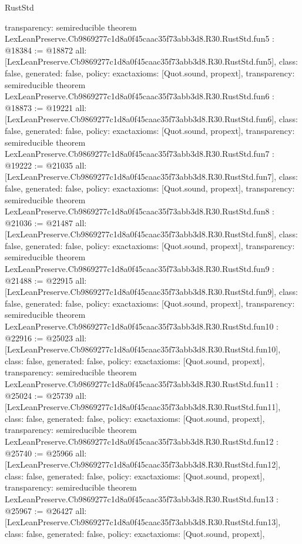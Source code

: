 \begin{lexlean}{RustStd}
\begin{coremodule}
{  transparency: semireducible
}
theorem LexLeanPreserve.Cb9869277c1d8a0f45caac35f73abb3d8.R30.RustStd.fun5 : @18384 := @18872 {
  all: [LexLeanPreserve.Cb9869277c1d8a0f45caac35f73abb3d8.R30.RustStd.fun5],
  class: false,
  generated: false,
  policy: exact{axioms: [Quot.sound, propext]},
  transparency: semireducible
}
theorem LexLeanPreserve.Cb9869277c1d8a0f45caac35f73abb3d8.R30.RustStd.fun6 : @18873 := @19221 {
  all: [LexLeanPreserve.Cb9869277c1d8a0f45caac35f73abb3d8.R30.RustStd.fun6],
  class: false,
  generated: false,
  policy: exact{axioms: [Quot.sound, propext]},
  transparency: semireducible
}
theorem LexLeanPreserve.Cb9869277c1d8a0f45caac35f73abb3d8.R30.RustStd.fun7 : @19222 := @21035 {
  all: [LexLeanPreserve.Cb9869277c1d8a0f45caac35f73abb3d8.R30.RustStd.fun7],
  class: false,
  generated: false,
  policy: exact{axioms: [Quot.sound, propext]},
  transparency: semireducible
}
theorem LexLeanPreserve.Cb9869277c1d8a0f45caac35f73abb3d8.R30.RustStd.fun8 : @21036 := @21487 {
  all: [LexLeanPreserve.Cb9869277c1d8a0f45caac35f73abb3d8.R30.RustStd.fun8],
  class: false,
  generated: false,
  policy: exact{axioms: [Quot.sound, propext]},
  transparency: semireducible
}
theorem LexLeanPreserve.Cb9869277c1d8a0f45caac35f73abb3d8.R30.RustStd.fun9 : @21488 := @22915 {
  all: [LexLeanPreserve.Cb9869277c1d8a0f45caac35f73abb3d8.R30.RustStd.fun9],
  class: false,
  generated: false,
  policy: exact{axioms: [Quot.sound, propext]},
  transparency: semireducible
}
theorem LexLeanPreserve.Cb9869277c1d8a0f45caac35f73abb3d8.R30.RustStd.fun10 : @22916 := @25023 {
  all: [LexLeanPreserve.Cb9869277c1d8a0f45caac35f73abb3d8.R30.RustStd.fun10],
  class: false,
  generated: false,
  policy: exact{axioms: [Quot.sound, propext]},
  transparency: semireducible
}
theorem LexLeanPreserve.Cb9869277c1d8a0f45caac35f73abb3d8.R30.RustStd.fun11 : @25024 := @25739 {
  all: [LexLeanPreserve.Cb9869277c1d8a0f45caac35f73abb3d8.R30.RustStd.fun11],
  class: false,
  generated: false,
  policy: exact{axioms: [Quot.sound, propext]},
  transparency: semireducible
}
theorem LexLeanPreserve.Cb9869277c1d8a0f45caac35f73abb3d8.R30.RustStd.fun12 : @25740 := @25966 {
  all: [LexLeanPreserve.Cb9869277c1d8a0f45caac35f73abb3d8.R30.RustStd.fun12],
  class: false,
  generated: false,
  policy: exact{axioms: [Quot.sound, propext]},
  transparency: semireducible
}
theorem LexLeanPreserve.Cb9869277c1d8a0f45caac35f73abb3d8.R30.RustStd.fun13 : @25967 := @26427 {
  all: [LexLeanPreserve.Cb9869277c1d8a0f45caac35f73abb3d8.R30.RustStd.fun13],
  class: false,
  generated: false,
  policy: exact{axioms: [Quot.sound, propext]},
}
\end{coremodule}
\end{lexlean}
